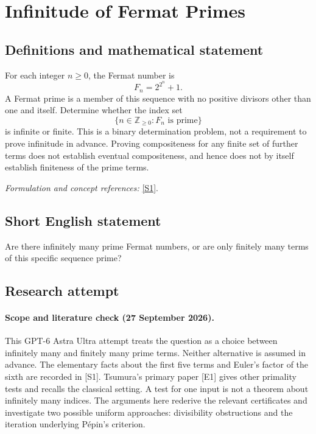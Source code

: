 \documentclass[11pt]{article}
\begin{document}
\section*{\texorpdfstring{Infinitude of Fermat Primes}{Infinitude of Fermat Primes}}\label{476}
\subsection{Definitions and mathematical statement}
For each integer $n\ge0$, the Fermat number is
\[
 F_n=2^{2^n}+1.
\]
A Fermat prime is a member of this sequence with no positive divisors other than one and itself. Determine whether the index set
\[
 \{n\in{\mathbb{Z}}_{\ge0}:F_n\text{ is prime}\}
\]
is infinite or finite. This is a binary determination problem, not a requirement to prove infinitude in advance. Proving compositeness for any finite set of further terms does not establish eventual compositeness, and hence does not by itself establish finiteness of the prime terms.
\par\smallskip\textit{Formulation and concept references:} \href{https://webusers.imj-prg.fr/~michel.waldschmidt/articles/pdf/NTchallengesVI.pdf}{[S1]}.

\subsection{Short English statement}
Are there infinitely many prime Fermat numbers, or are only finitely many terms of this specific sequence prime?
\subsection{Research attempt}
\paragraph{Scope and literature check (27 September 2026).}
This GPT-6 Astra Ultra attempt treats the question as a choice between
infinitely many and finitely many prime terms. Neither alternative is
assumed in advance. The elementary facts about the first five terms and
Euler's factor of the sixth are recorded in [S1]. Tsumura's primary
paper [E1] gives other primality tests and recalls the classical setting.
A test for one input is not a theorem about infinitely many indices.
The arguments here rederive the relevant certificates and investigate
two possible uniform approaches: divisibility obstructions and the
iteration underlying P\'epin's criterion.
\end{document}

